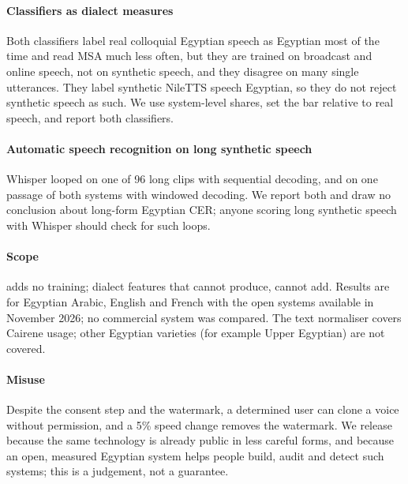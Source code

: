 \paragraph{Classifiers as dialect measures}
Both classifiers label real colloquial Egyptian speech as Egyptian most of the time and read MSA much less often, but
they are trained on broadcast and online speech, not on synthetic speech, and they disagree on many single utterances.
They label synthetic NileTTS speech Egyptian, so they do not reject synthetic speech as such. We use system-level
shares, set the bar relative to real speech, and report both classifiers.

\paragraph{Automatic speech recognition on long synthetic speech}
Whisper looped on one of 96 long clips with sequential decoding, and on one passage of both systems with windowed
decoding. We report both and draw no conclusion about long-form Egyptian CER; anyone scoring long synthetic speech
with Whisper should check for such loops.

\paragraph{Scope}
\BA adds no training; dialect features that \vox cannot produce, \BA cannot add. Results are for Egyptian Arabic,
English and French with the open systems available in November 2026; no commercial system was compared. The text
normaliser covers Cairene usage; other Egyptian varieties (for example Upper Egyptian) are not covered.

\paragraph{Misuse}
Despite the consent step and the watermark, a determined user can clone a voice without permission, and a 5\% speed
change removes the watermark. We release because the same technology is already public in less careful forms, and
because an open, measured Egyptian system helps people build, audit and detect such systems; this is a judgement, not
a guarantee.
